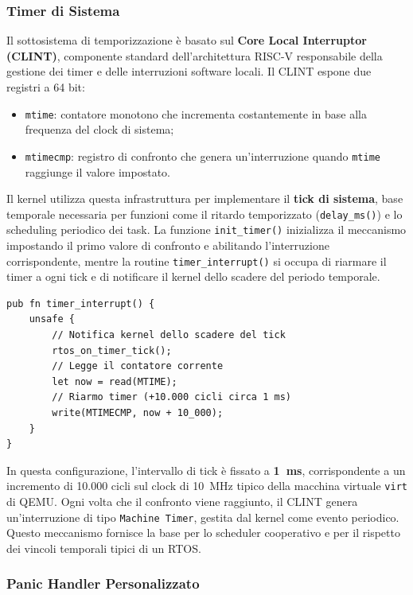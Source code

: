 \documentclass[italian, Lau, oneside]{sapthesis} %
\begin{document}
\subsubsection*{Timer di Sistema}

Il sottosistema di temporizzazione è basato sul \textbf{Core Local Interruptor (CLINT)}, componente standard dell’architettura RISC-V responsabile della gestione dei timer e delle interruzioni software locali.  
Il CLINT espone due registri a 64 bit:
\begin{itemize}
    \item \texttt{mtime}: contatore monotono che incrementa costantemente in base alla frequenza del clock di sistema;
    \item \texttt{mtimecmp}: registro di confronto che genera un’interruzione quando \texttt{mtime} raggiunge il valore impostato.
\end{itemize}

Il kernel utilizza questa infrastruttura per implementare il \textbf{tick di sistema}, base temporale necessaria per funzioni come il ritardo temporizzato (\texttt{delay\_ms()}) e lo scheduling periodico dei task.  
La funzione \texttt{init\_timer()} inizializza il meccanismo impostando il primo valore di confronto e abilitando l’interruzione corrispondente, mentre la routine \texttt{timer\_interrupt()} si occupa di riarmare il timer a ogni tick e di notificare il kernel dello scadere del periodo temporale.

\begin{center}
\begin{verbatim}
pub fn timer_interrupt() {
    unsafe {
        // Notifica kernel dello scadere del tick
        rtos_on_timer_tick();
        // Legge il contatore corrente
        let now = read(MTIME);
        // Riarmo timer (+10.000 cicli circa 1 ms)
        write(MTIMECMP, now + 10_000);
    }
}
\end{verbatim}
\end{center}

In questa configurazione, l’intervallo di tick è fissato a \textbf{1~ms}, corrispondente a un incremento di 10.000 cicli sul clock di 10~MHz tipico della macchina virtuale \texttt{virt} di QEMU.  
Ogni volta che il confronto viene raggiunto, il CLINT genera un’interruzione di tipo \texttt{Machine Timer}, gestita dal kernel come evento periodico.  
Questo meccanismo fornisce la base per lo scheduler cooperativo e per il rispetto dei vincoli temporali tipici di un RTOS.

\subsubsection*{Panic Handler Personalizzato}
\end{document}
